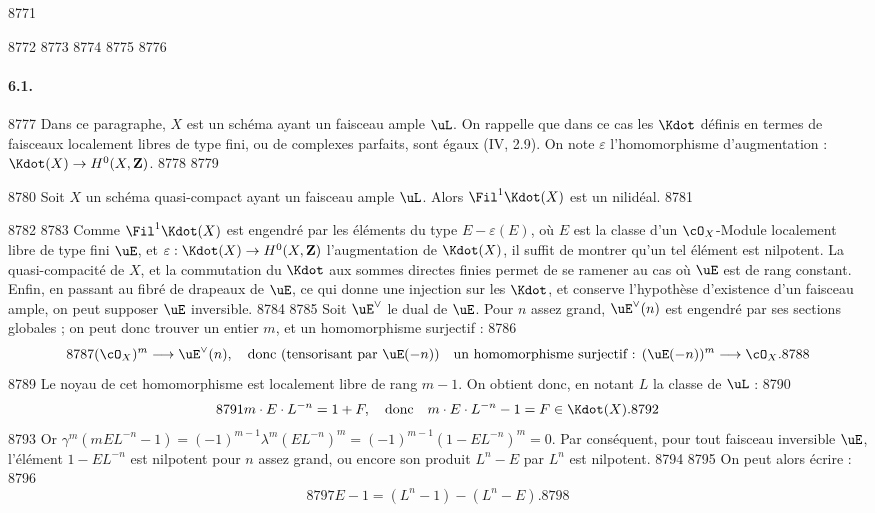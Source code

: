   8771	
  8772	
  8773	\setcounter{section}{6}
  8774	\setcounter{subsection}{0}
  8775	
  8776	\paragraph{6.1.}
  8777	Dans ce paragraphe, $X$ est un sch\'ema ayant un faisceau ample $\uL$. On rappelle que dans ce cas les $\Kdot$ d\'efinis en termes de faisceaux localement libres de type fini, ou de complexes parfaits, sont \'egaux (IV, 2.9). On note $\varepsilon$ l'homomorphisme d'augmentation : $\Kdot(X) \to H^{0}(X,\mathbf{Z})$.
  8778	
  8779	\begin{proposition}[6.1]
  8780	Soit $X$ un sch\'ema quasi-compact ayant un faisceau ample $\uL$. Alors $\Fil^1 \Kdot(X)$ est un nilid\'eal.
  8781	\end{proposition}
  8782	
  8783	Comme $\Fil^1 \Kdot(X)$ est engendr\'e par les \'el\'ements du type $E - \varepsilon(E)$, o\`u $E$ est la classe d'un $\cO_X$-Module localement libre de type fini $\uE$, et $\varepsilon: \Kdot(X) \to H^0(X,\mathbf{Z})$ l'augmentation de $\Kdot(X)$, il suffit de montrer qu'un tel \'el\'ement est nilpotent. La quasi-compacit\'e de $X$, et la commutation du $\Kdot$ aux sommes directes finies permet de se ramener au cas o\`u $\uE$ est de rang constant. Enfin, en passant au fibr\'e de drapeaux de $\uE$, ce qui donne une injection sur les $\Kdot$, et conserve l'hypoth\`ese d'existence d'un faisceau ample, on peut supposer $\uE$ inversible.
  8784	
  8785	Soit $\uE^{\vee}$ le dual de $\uE$. Pour $n$ assez grand, $\uE^{\vee}(n)$ est engendr\'e par ses sections globales ; on peut donc trouver un entier $m$, et un homomorphisme surjectif :
  8786	\[
  8787	(\cO_X)^m \longrightarrow \uE^{\vee}(n), \quad \text{donc (tensorisant par } \uE(-n)) \quad \text{un homomorphisme surjectif : } (\uE(-n))^m \longrightarrow \cO_X.
  8788	\]
  8789	Le noyau de cet homomorphisme est localement libre de rang $m-1$. On obtient donc, en notant $L$ la classe de $\uL$ :
  8790	\[
  8791	m \cdot E \cdot L^{-n} = 1 + F, \quad \text{donc} \quad m \cdot E \cdot L^{-n} - 1 = F \in \Kdot(X).
  8792	\]
  8793	Or $\gamma^m(m E L^{-n} - 1) = (-1)^{m-1} \lambda^m(E L^{-n})^m = (-1)^{m-1} (1 - E L^{-n})^m = 0$. Par cons\'equent, pour tout faisceau inversible $\uE$, l'\'el\'ement $1 - E L^{-n}$ est nilpotent pour $n$ assez grand, ou encore son produit $L^n - E$ par $L^n$ est nilpotent.
  8794	
  8795	On peut alors \'ecrire :
  8796	\[
  8797	E - 1 = (L^n - 1) - (L^n - E).
  8798	\]

